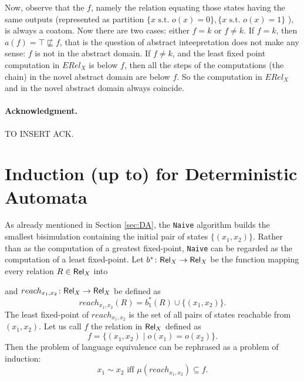 \documentclass{llncs}
\begin{document}
Now, observe that the $f$, namely the relation equating those states having the same outputs (represented as partition $\{x\text{ s.t. } o(x)=0\}, \{x \text{ s.t. } o(x)=1\}$ ),  is always a coatom. Now there are two cases: either $f=k$ or $f\neq k$. If $f=k$, then $a(f)=\top \not \sqsubseteq f$, that is the question of abstract inteepretation does not make any sense: $f$ is not in the abstract domain. If $f\neq k$, and the least fixed point computation in $ERel_X$ is below $f$, then all the steps of the computations (the chain) in the novel abstract domain are below $f$. So the computation in $ERel_X$ and in the novel abstract domain always coincide.













\paragraph{Acknowledgment.} TO INSERT ACK.



\clearpage
\appendix
%
%

\section{Induction (up to) for Deterministic Automata}
%
As already mentioned in Section \ref{sec:DA}, the \texttt{Naive} algorithm builds the smallest bisimulation containing the initial pair of states $\{(x_1,x_2)\}$. Rather than as the computation of a greatest fixed-point, \texttt{Naive} can be regarded as the computation of a least fixed-point.
Let $b^*\colon \mathsf{Rel}_X \to \mathsf{Rel}_X$ be the function mapping every relation $R\in \mathsf{Rel}_X$ into

and $reach_{x_1,x_2}\colon \mathsf{Rel}_X \to \mathsf{Rel}_X$ be defined as 
$$reach_{x_1,x_2}(R) = b_1^*(R) \cup \{(x_1,x_2)\}\text{.}$$
The least fixed-point of $reach_{x_1,x_2}$ is the set of all pairs of states reachable from $(x_1,x_2)$.
Let us call $f$ the relation in $\mathsf{Rel}_X$ defined as 
\begin{equation}\label{eq:fDA}
f=\{(x_1,x_2)  \mid o(x_1)=o(x_2) \}\text{.}
\end{equation}
Then the problem of language equivalence can be rephrased as a problem of induction:
$$x_1\sim x_2 \text{ iff } \mu (reach_{x_1,x_2}) \subseteq f\text{.}$$
\end{document}
